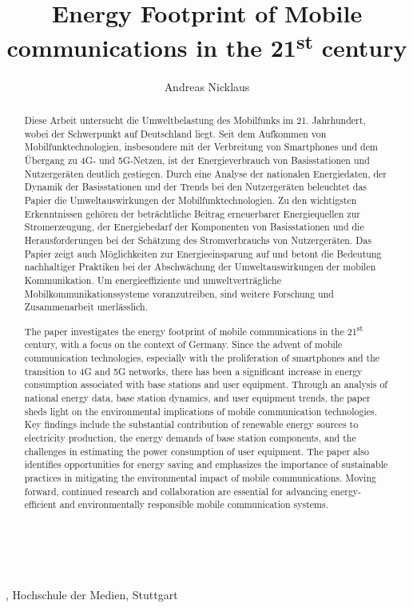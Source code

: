 \documentclass[11pt,a4paper]{article}
\title{Energy Footprint of Mobile communications in the 21\textsuperscript{st} century}
\author{Andreas Nicklaus}
\makeatletter
\renewcommand\maketitle{
{\raggedright
\begin{center}
{\Large \bfseries \@title}\\[2ex] 
\@author\\[1ex] 
\@date, Hochschule der Medien, Stuttgart\\[1ex]
\end{center}}}
\makeatother
\begin{document}
\maketitle

\begin{abstract}
  Diese Arbeit untersucht die Umweltbelastung des Mobilfunks im 21. Jahrhundert, wobei der Schwerpunkt auf Deutschland liegt.
  Seit dem Aufkommen von Mobilfunktechnologien, insbesondere mit der Verbreitung von Smartphones und dem Übergang zu 4G- und 5G-Netzen, ist der Energieverbrauch von Basisstationen und Nutzergeräten deutlich gestiegen.
  Durch eine Analyse der nationalen Energiedaten, der Dynamik der Basisstationen und der Trends bei den Nutzergeräten beleuchtet das Papier die Umweltauswirkungen der Mobilfunktechnologien.
  Zu den wichtigsten Erkenntnissen gehören der beträchtliche Beitrag erneuerbarer Energiequellen zur Stromerzeugung, der Energiebedarf der Komponenten von Basisstationen und die Herausforderungen bei der Schätzung des Stromverbrauchs von Nutzergeräten.
  Das Papier zeigt auch Möglichkeiten zur Energieeinsparung auf und betont die Bedeutung nachhaltiger Praktiken bei der Abschwächung der Umweltauswirkungen der mobilen Kommunikation.
  Um energieeffiziente und umweltverträgliche Mobilkommunikationssysteme voranzutreiben, sind weitere Forschung und Zusammenarbeit unerlässlich.
\end{abstract}

\begin{abstract}
  The paper investigates the energy footprint of mobile communications in the 21\textsuperscript{st} century, with a focus on the context of Germany.
  Since the advent of mobile communication technologies, especially with the proliferation of smartphones and the transition to 4G and 5G networks, there has been a significant increase in energy consumption associated with base stations and user equipment.
  Through an analysis of national energy data, base station dynamics, and user equipment trends, the paper sheds light on the environmental implications of mobile communication technologies.
  Key findings include the substantial contribution of renewable energy sources to electricity production, the energy demands of base station components, and the challenges in estimating the power consumption of user equipment.
  The paper also identifies opportunities for energy saving and emphasizes the importance of sustainable practices in mitigating the environmental impact of mobile communications.
  Moving forward, continued research and collaboration are essential for advancing energy-efficient and environmentally responsible mobile communication systems.
\end{abstract}
\end{document}
